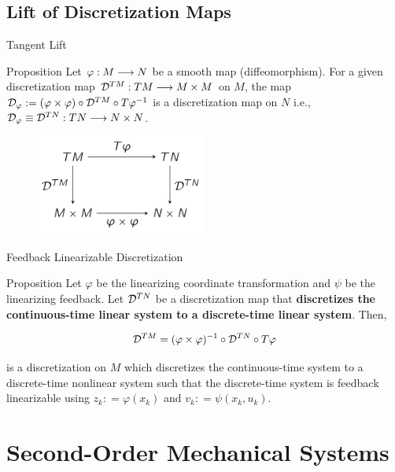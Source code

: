 \documentclass{beamer}
\begin{document}
\subsection{Lift of Discretization Maps}
\begin{frame}{Tangent Lift}
  \begin{block}{Proposition}
    Let $\varphi: M \longrightarrow N$ be a smooth map (diffeomorphism). For a given discretization map $\mathcal{D}^{TM} : TM \longrightarrow M \times M$ on $M$, the map $\mathcal{D}_{\varphi} :=  (\varphi \times \varphi) \circ \mathcal{D}^{TM} \circ T \varphi ^{-1}$ is a discretization map on $N$ i.e., $\mathcal{D}_{\varphi} \equiv \mathcal{D}^{TN} : TN \longrightarrow N \times N$.
  \end{block}

  \begin{figure}[h]
    \centering
    \includegraphics[width=0.5\textwidth]{../Figures/commutator.png}
  \end{figure}
\end{frame}

\begin{frame}{Feedback Linearizable Discretization}
  \begin{block}{Proposition}
    Let $\varphi$ be the linearizing coordinate transformation and $\psi$ be the linearizing feedback. Let $\mathcal{D}^{TN}$ be a discretization map that \textbf{discretizes the continuous-time linear system to a discrete-time linear system}. Then,

    \[
      \mathcal{D}^{TM} = (\varphi \times \varphi)^{-1} \circ \mathcal{D}^{TN} \circ T \varphi
    \]

    is a discretization on $M$ which discretizes the continuous-time system to a discrete-time nonlinear system such that the discrete-time system is feedback linearizable using $z_k : = \varphi(x_k)$ and $v_k : = \psi(x_k, u_k)$.
  \end{block}
  
\end{frame}

\section{Second-Order Mechanical Systems}
\end{document}
